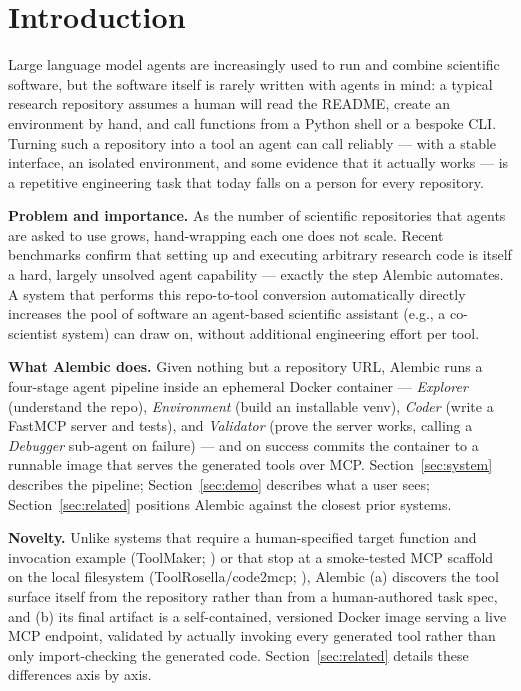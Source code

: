\section{Introduction}
\label{sec:intro}

Large language model agents are increasingly used to run and combine scientific software, but the software itself is rarely written with agents in mind: a typical research repository assumes a human will read the README, create an environment by hand, and call functions from a Python shell or a bespoke CLI. Turning such a repository into a tool an agent can call reliably — with a stable interface, an isolated environment, and some evidence that it actually works — is a repetitive engineering task that today falls on a person for every repository.

\textbf{Problem and importance.} As the number of scientific repositories that agents are asked to use grows, hand-wrapping each one does not scale. Recent benchmarks confirm that setting up and executing arbitrary research code is itself a hard, largely unsolved agent capability \citep{super2024,corebench2024,astabench2025,researchenvbench2026} — exactly the step Alembic automates. A system that performs this repo-to-tool conversion automatically directly increases the pool of software an agent-based scientific assistant (e.g., a co-scientist system) can draw on, without additional engineering effort per tool.

\textbf{What Alembic does.} Given nothing but a repository URL, Alembic runs a four-stage agent pipeline inside an ephemeral Docker container — \emph{Explorer} (understand the repo), \emph{Environment} (build an installable venv), \emph{Coder} (write a FastMCP server and tests), and \emph{Validator} (prove the server works, calling a \emph{Debugger} sub-agent on failure) — and on success commits the container to a runnable image that serves the generated tools over MCP. Section~\ref{sec:system} describes the pipeline; Section~\ref{sec:demo} describes what a user sees; Section~\ref{sec:related} positions Alembic against the closest prior systems.

\textbf{Novelty.} Unlike systems that require a human-specified target function and invocation example (ToolMaker; \citealp{toolmaker2025}) or that stop at a smoke-tested MCP scaffold on the local filesystem (ToolRosella/code2mcp; \citealp{toolrosella2026}), Alembic (a) discovers the tool surface itself from the repository rather than from a human-authored task spec, and (b) its final artifact is a self-contained, versioned Docker image serving a live MCP endpoint, validated by actually invoking every generated tool rather than only import-checking the generated code. Section~\ref{sec:related} details these differences axis by axis.
